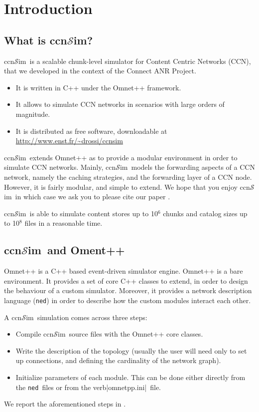 \documentclass{article}
\newcommand{\ccnsim}{ccn$\mathcal{S}$im}
\newcommand{\ned}{\texttt{ned}}
\newcommand{\ini}{verb|omnetpp.ini|}
\begin{document}
\tableofcontents
\newpage
\section{Introduction}
\subsection{What is \ccnsim?}
\ccnsim\ is a scalable chunk-level simulator for Content Centric Networks (CCN)\cite{jacobson09conext}, that we developed in the context of the Connect  ANR Project.

\begin{itemize}
    \item It is written in C++ under the Omnet++ framework.
    \item It  allows to simulate CCN networks in scenarios with large orders of magnitude.
    \item It is distributed as free software, downloadable at \url{http://www.enst.fr/~drossi/ccnsim}
\end{itemize}

\ccnsim\ extends Omnet++ as to provide a modular environment in order to simulate CCN networks. Mainly,  \ccnsim\ models the forwarding aspects of a CCN network, namely the caching strategies, and the forwarding layer of a CCN node. However, it is fairly modular, and simple to extend. We hope that you enjoy \ccnsim\, in which case we ask you to please cite our paper \cite{ccn12icc}. 

\ccnsim\ is able to simulate content stores up to 10$^6$ chunks and catalog sizes up to 10$^8$ files in a reasonable time.  

\subsection{\ccnsim\ and Oment++}
Omnet++ is a C++ based event-driven simulator engine. Omnet++ is a bare environment. It provides a set of core C++ classes to extend, in order to design the behaviour of a custom simulator.  Moreover, it provides a network description language (\verb|ned|) in order to describe how the custom modules interact each other. 

A \ccnsim\ simulation comes across three steps:
\begin{itemize}
    \item Compile \ccnsim\ source files with the Omnet++ core classes.
    \item Write the description of the topology (usually the user will need only to set up connections, and defining the cardinality of the network graph).
    \item Initialize parameters of each module. This can be done either directly from the \ned\ files or from the \ini\ file. 
\end{itemize}
We report the aforementioned steps in .
\end{document}
